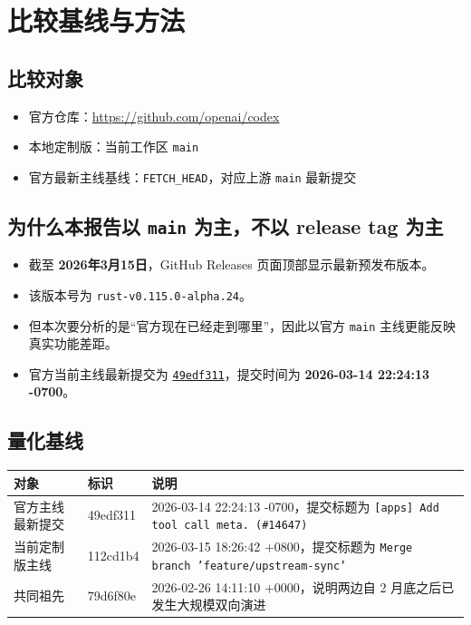 \documentclass[UTF8,11pt]{ctexart}
\begin{document}
\section{比较基线与方法}

\subsection{比较对象}
\begin{itemize}[nosep]
  \item 官方仓库：\url{https://github.com/openai/codex}
  \item 本地定制版：当前工作区 \texttt{main}
  \item 官方最新主线基线：\texttt{FETCH\_HEAD}，对应上游 \texttt{main} 最新提交
\end{itemize}

\subsection{为什么本报告以 \texttt{main} 为主，不以 release tag 为主}
\begin{itemize}[nosep]
  \item 截至 \textbf{2026年3月15日}，GitHub Releases 页面顶部显示最新预发布版本。
  \item 该版本号为 \texttt{rust-v0.115.0-alpha.24}。
  \item 但本次要分析的是“官方现在已经走到哪里”，因此以官方 \texttt{main} 主线更能反映真实功能差距。
  \item 官方当前主线最新提交为 \href{https://github.com/openai/codex/commit/49edf311ac3ae84659b0ec5eacd5e471c881eee8}{\texttt{49edf311}}，提交时间为 \textbf{2026-03-14 22:24:13 -0700}。
\end{itemize}

\subsection{量化基线}
\begin{center}
\small
\begin{tabularx}{\textwidth}{>{\ttfamily}l Y Y}
\toprule
对象 & 标识 & 说明 \\
\midrule
官方主线最新提交 & 49edf311 & 2026-03-14 22:24:13 -0700，提交标题为 \texttt{[apps] Add tool call meta. (\#14647)} \\
当前定制版主线 & 112cd1b4 & 2026-03-15 18:26:42 +0800，提交标题为 \texttt{Merge branch 'feature/upstream-sync'} \\
共同祖先 & 79d6f80e & 2026-02-26 14:11:10 +0000，说明两边自 2 月底之后已发生大规模双向演进 \\
\bottomrule
\end{tabularx}
\end{center}
\end{document}

